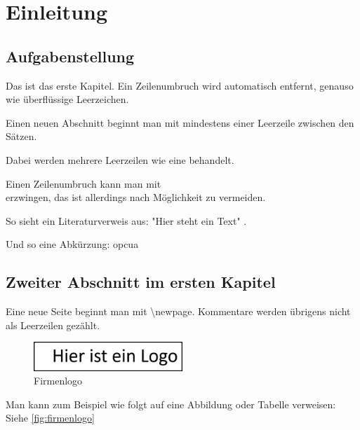 \chapter{Einleitung}        %
\section{Aufgabenstellung}  %
Das ist das erste Kapitel.
Ein Zeilenumbruch wird automatisch entfernt, genauso    wie   überflüssige                 Leerzeichen.

Einen neuen Abschnitt beginnt man mit mindestens einer Leerzeile zwischen den Sätzen.




Dabei werden mehrere Leerzeilen wie eine behandelt.

Einen Zeilenumbruch kann man mit \\ erzwingen, das ist allerdings nach Möglichkeit zu vermeiden.

So sieht ein Literaturverweis aus: "Hier steht ein Text" \cite{OPCFoundation}.

Und so eine Abkürzung: \Gls{opcua}
\newpage
\section{Zweiter Abschnitt im ersten Kapitel}
Eine neue Seite beginnt man mit \textbackslash newpage.
Kommentare werden übrigens nicht als Leerzeilen gezählt.

\begin{figure}[h]                                               %
    \includegraphics[width=0.5\textwidth]{content/img/company.png}        %
    \caption{Firmenlogo}                                        %
    \label{fig:firmenlogo}                                      %
\end{figure}

Man kann zum Beispiel wie folgt auf eine Abbildung oder Tabelle verweisen: Siehe \autoref{fig:firmenlogo}

